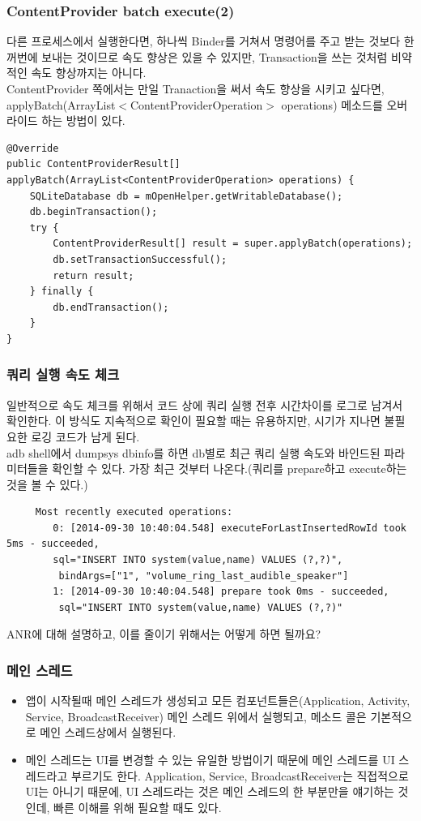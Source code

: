 \documentclass{beamer}
\newcommand\Fontvi{\fontsize{8}{9.6}\selectfont}
\begin{document}
\begin{frame}[fragile]
\frametitle{ContentProvider batch execute(2)}
다른 프로세스에서 실행한다면, 하나씩 Binder를 거쳐서 명령어를 주고 받는 것보다 한꺼번에 보내는 것이므로 속도 향상은 있을 수 있지만, Transaction을 쓰는 것처럼 비약적인 속도 향상까지는 아니다.\\
ContentProvider 쪽에서는 만일 Tranaction을 써서 속도 향상을 시키고 싶다면,
applyBatch(ArrayList$<$ContentProviderOperation$>$ operations) 메소드를 오버라이드 하는 방법이 있다.
\Fontvi
\begin{verbatim} 
@Override
public ContentProviderResult[] applyBatch(ArrayList<ContentProviderOperation> operations) {
    SQLiteDatabase db = mOpenHelper.getWritableDatabase();
    db.beginTransaction();
    try {
        ContentProviderResult[] result = super.applyBatch(operations);
        db.setTransactionSuccessful();
        return result;
    } finally {
        db.endTransaction();
    }
}
\end{verbatim}
\end{frame}


\begin{frame}[fragile]
\frametitle{쿼리 실행 속도 체크}
일반적으로 속도 체크를 위해서 코드 상에 쿼리 실행 전후 시간차이를 로그로 남겨서 확인한다. 이 방식도 지속적으로 확인이 필요할 때는 유용하지만, 시기가 지나면 불필요한 로깅 코드가 남게 된다.\\
adb shell에서 dumpsys dbinfo를 하면 db별로 최근 쿼리 실행 속도와 바인드된 파라미터들을 확인할 수 있다. 
가장 최근 것부터 나온다.(쿼리를 prepare하고 execute하는 것을 볼 수 있다.)

\Fontvi
\begin{verbatim} 
     Most recently executed operations:
        0: [2014-09-30 10:40:04.548] executeForLastInsertedRowId took 5ms - succeeded, 
        sql="INSERT INTO system(value,name) VALUES (?,?)",
         bindArgs=["1", "volume_ring_last_audible_speaker"]
        1: [2014-09-30 10:40:04.548] prepare took 0ms - succeeded,
         sql="INSERT INTO system(value,name) VALUES (?,?)"
\end{verbatim}

\end{frame}

\begin{frame}
ANR에 대해 설명하고, 이를 줄이기 위해서는 어떻게 하면 될까요?
\end{frame}

\begin{frame}
\frametitle{메인 스레드}
\begin{itemize}
\item 앱이 시작될때 메인 스레드가 생성되고 모든 컴포넌트들은(Application, Activity, Service, BroadcastReceiver) 메인 스레드 위에서 실행되고, 메소드 콜은 기본적으로 메인 스레드상에서 실행된다.
\item 메인 스레드는 UI를 변경할 수 있는 유일한 방법이기 때문에 메인 스레드를 UI 스레드라고 부르기도 한다.
Application, Service, BroadcastReceiver는 직접적으로 UI는 아니기 때문에, UI 스레드라는 것은 메인 스레드의 한 부분만을 얘기하는 것인데, 빠른 이해를 위해 필요할 때도 있다.
\end{itemize}
\end{frame}
\end{document}
